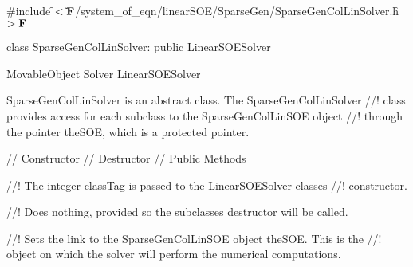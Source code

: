 
\indent \#include \f$<\tilde{ }{\bf F}$/system\_of\_eqn/linearSOE/SparseGen/SparseGenColLinSolver.h\f$>{\bf F}$

\indent class SparseGenColLinSolver: public LinearSOESolver

\indent MovableObject
\indent\indent  Solver
\indent\indent\indent LinearSOESolver
\indent\indent\indent{}

\indent SparseGenColLinSolver is an abstract class.  The SparseGenColLinSolver
//! class provides access for each subclass to the SparseGenColLinSOE object
//! through the pointer \p theSOE, which is a protected pointer.

\indent\indent // Constructor
\indent{}
\indent\indent // Destructor
\indent{}
\indent\indent // Public Methods
\indent{}

//! The integer \p classTag is passed to the LinearSOESolver classes
//! constructor. 

//! Does nothing, provided so the subclasses destructor will be called.

//! Sets the link to the SparseGenColLinSOE object \p theSOE. This is the
//! object on which the solver will perform the numerical computations.




